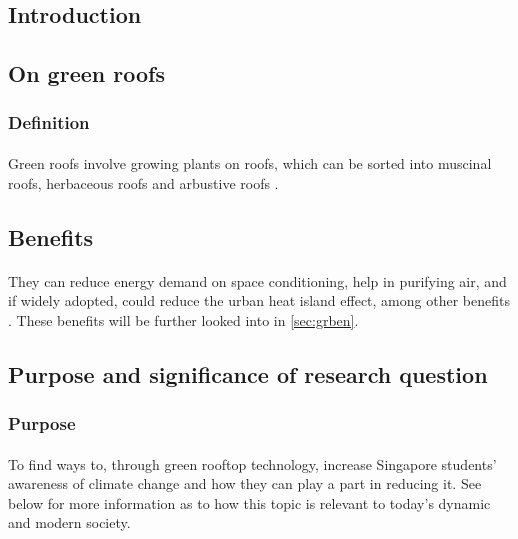 \documentclass[a4paper]{article}
\begin{document}
\newpage

\tableofcontents

\newpage

\begin{multicols}{2}

  \section{Introduction}
  \subsection{On green roofs}
  \subsubsection{Definition}
  \paragraph{} Green roofs involve growing plants on roofs, which can
  be sorted into muscinal roofs, herbaceous roofs and arbustive roofs
  \parencite{ecoeng}.


  \subsection{Benefits}
  \paragraph{} They can reduce energy demand on space conditioning,
  help in purifying air, and if widely adopted, could reduce the urban
  heat island effect, among other benefits \parencite{energeff}. These
  benefits will be further looked into in \cref{sec:grben}.


  \subsection{Purpose and significance of research question}
  \subsubsection{Purpose}
  \paragraph{} To find ways to, through green rooftop technology, increase
  Singapore students' awareness of climate change and how they can play
  a part in reducing it. See below for more information as to how this
  topic is relevant to today's dynamic and modern society.


\end{multicols}
\end{document}
